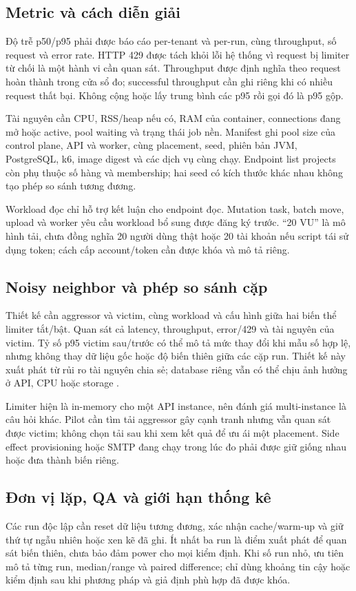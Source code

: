 \subsection{Metric và cách diễn giải}
Độ trễ p50\slash p95 phải được báo cáo per-tenant và per-run, cùng throughput, số request và error rate. HTTP 429 được tách khỏi lỗi hệ thống vì request bị limiter từ chối là một hành vi cần quan sát. Throughput được định nghĩa theo request hoàn thành trong cửa sổ đo; successful throughput cần ghi riêng khi có nhiều request thất bại. Không cộng hoặc lấy trung bình các p95 rồi gọi đó là p95 gộp.

Tài nguyên cần CPU, RSS\slash heap nếu có, RAM của container, connections đang mở hoặc active, pool waiting và trạng thái job nền. Manifest ghi pool size của control plane, API và worker, cùng placement, seed, phiên bản JVM, PostgreSQL, k6, image digest và các dịch vụ cùng chạy. Endpoint list projects còn phụ thuộc số hàng và membership; hai seed có kích thước khác nhau không tạo phép so sánh tương đương.

Workload đọc chỉ hỗ trợ kết luận cho endpoint đọc. Mutation task, batch move, upload và worker yêu cầu workload bổ sung được đăng ký trước. ``20 VU'' là mô hình tải, chưa đồng nghĩa 20 người dùng thật hoặc 20 tài khoản nếu script tái sử dụng token; cách cấp account\slash token cần được khóa và mô tả riêng.

\subsection{Noisy neighbor và phép so sánh cặp}
Thiết kế cần aggressor và victim, cùng workload và cấu hình giữa hai biến thể limiter tắt\slash bật. Quan sát cả latency, throughput, error\slash 429 và tài nguyên của victim. Tỷ số p95 victim sau\slash trước có thể mô tả mức thay đổi khi mẫu số hợp lệ, nhưng không thay dữ liệu gốc hoặc độ biến thiên giữa các cặp run. Thiết kế này xuất phát từ rủi ro tài nguyên chia sẻ; database riêng vẫn có thể chịu ảnh hưởng ở API, CPU hoặc storage \citep{awsNoisyNeighbor}.

Limiter hiện là in-memory cho một API instance, nên đánh giá multi-instance là câu hỏi khác. Pilot cần tìm tải aggressor gây cạnh tranh nhưng vẫn quan sát được victim; không chọn tải sau khi xem kết quả để ưu ái một placement. Side effect provisioning hoặc SMTP đang chạy trong lúc đo phải được giữ giống nhau hoặc đưa thành biến riêng.

\subsection{Đơn vị lặp, QA và giới hạn thống kê}
Các run độc lập cần reset dữ liệu tương đương, xác nhận cache\slash warm-up và giữ thứ tự ngẫu nhiên hoặc xen kẽ đã ghi. Ít nhất ba run là điểm xuất phát để quan sát biến thiên, chưa bảo đảm power cho mọi kiểm định. Khi số run nhỏ, ưu tiên mô tả từng run, median\slash range và paired difference; chỉ dùng khoảng tin cậy hoặc kiểm định sau khi phương pháp và giả định phù hợp đã được khóa.

